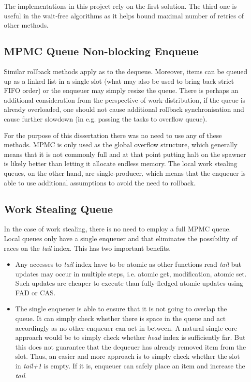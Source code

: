 \documentclass[12pt,a4paper,twoside]{report}
\begin{document}
The implementations in this project rely on the first solution. The third one is useful in the wait-free algorithms as it helps bound maximal number of retries of other methods. 

\subsection{MPMC Queue Non-blocking Enqueue}

Similar rollback methods apply as to the dequeue. Moreover, items can be queued up as a linked list in a single slot (what may also be used to bring back strict FIFO order) or the enqueuer may simply resize the queue. There is perhaps an additional consideration from the perspective of work-distribution, if the queue is already overloaded, one should not cause additional rollback synchronisation and cause further slowdown (in e.g. passing the tasks to overflow queue). 

For the purpose of this dissertation there was no need to use any of these methods. MPMC is only used as the global overflow structure, which generally means that it is not commonly full and at that point putting halt on the spawner is likely better than letting it allocate endless memory. The local work stealing queues, on the other hand, are single-producer, which means that the enqueuer is able to use additional assumptions to avoid the need to rollback.

\subsection{Work Stealing Queue}
\label{section:wss-queue}

In the case of work stealing, there is no need to employ a full MPMC queue. Local queues only have a single enqueuer and that eliminates the possibility of races on the \textit{tail} index. This has two important benefits.
\begin{itemize}
    \item Any accesses to \textit{tail} index have to be atomic as other functions read \textit{tail} but updates may occur in multiple steps, i.e. atomic get, modification, atomic set. Such updates are cheaper to execute than fully-fledged atomic updates using FAD or CAS. 
    \item The single enqueuer is able to ensure that it is not going to overlap the queue. It can simply check whether there is space in the queue and act accordingly as no other enqueuer can act in between. A natural single-core approach would be to simply check whether \textit{head} index is sufficiently far. But this does not guarantee that the dequeuer has already removed item from the slot. Thus, an easier and more approach is to simply check whether the slot in \textit{tail+1} is empty. If it is, enqueuer can safely place an item and increase the \textit{tail}.
\end{itemize}
\end{document}
